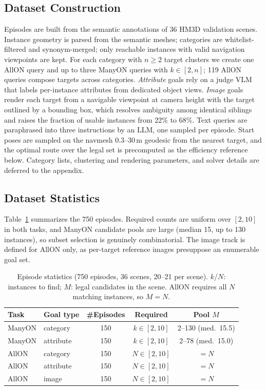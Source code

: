\subsection{Dataset Construction}
\label{sec:construction}

Episodes are built from the semantic annotations of 36 HM3D validation scenes. Instance geometry is parsed from the semantic meshes; categories are whitelist-filtered and synonym-merged; only reachable instances with valid navigation viewpoints are kept. For each category with $n \geq 2$ target clusters we create one AllON query and up to three ManyON queries with $k \in [2, n]$; 119 AllON queries compose targets across categories. \emph{Attribute} goals rely on a judge VLM that labels per-instance attributes from dedicated object views. \emph{Image} goals render each target from a navigable viewpoint at camera height with the target outlined by a bounding box, which resolves ambiguity among identical siblings and raises the fraction of usable instances from 22\% to 68\%. Text queries are paraphrased into three instructions by an LLM, one sampled per episode. Start poses are sampled on the navmesh 0.3--30\,m geodesic from the nearest target, and the optimal route over the legal set is precomputed as the efficiency reference below. Category lists, clustering and rendering parameters, and solver details are deferred to the appendix.

\subsection{Dataset Statistics}
\label{sec:statistics}

Table~\ref{tab:dataset} summarizes the 750 episodes. Required counts are uniform over $[2,10]$ in both tasks, and ManyON candidate pools are large (median 15, up to 130 instances), so subset selection is genuinely combinatorial. The image track is defined for AllON only, as per-target reference images presuppose an enumerable goal set.

\begin{table}[t]
\centering
\small
\caption{Episode statistics (750 episodes, 36 scenes, 20--21 per scene). $k$/$N$: instances to find; $M$: legal candidates in the scene. AllON requires all $N$ matching instances, so $M{=}N$.}
\label{tab:dataset}
\begin{tabular}{llccc}
\toprule
Task & Goal type & \#Episodes & Required & Pool $M$ \\
\midrule
ManyON & category  & 150 & $k \in [2,10]$ & 2--130 (med.\ 15.5) \\
ManyON & attribute & 150 & $k \in [2,10]$ & 2--78 (med.\ 15.0) \\
\midrule
AllON  & category  & 150 & $N \in [2,10]$ & $=N$ \\
AllON  & attribute & 150 & $N \in [2,10]$ & $=N$ \\
AllON  & image     & 150 & $N \in [2,10]$ & $=N$ \\
\bottomrule
\end{tabular}
\end{table}

